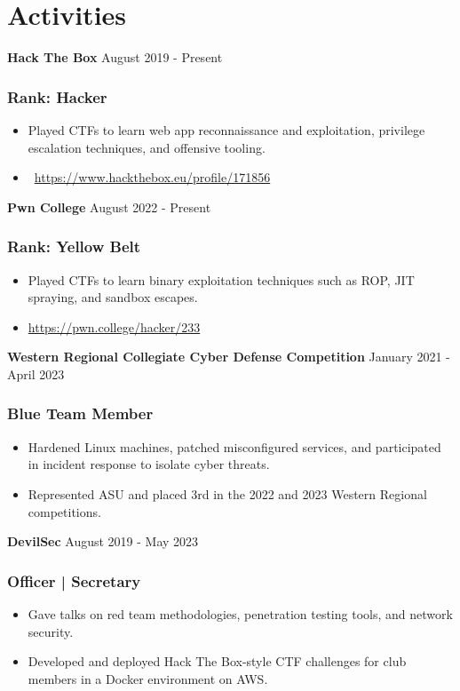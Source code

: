 \documentclass{article}
\newcommand{\resumesubsection}[2]{
	\noindent \textbf{#1} \hfill #2
}
\begin{document}
\section{Activities}

\resumesubsection{Hack The Box}{August 2019 - Present}
\subsubsection{Rank: Hacker}
\begin{itemize}
  \item Played CTFs to learn web app reconnaissance and exploitation, privilege escalation techniques, and offensive tooling.
  \item \faCube \ \url{https://www.hackthebox.eu/profile/171856}{}
\end{itemize}

\resumesubsection{Pwn College}{August 2022 - Present}
\subsubsection{Rank: Yellow Belt}
\begin{itemize}
  \item Played CTFs to learn binary exploitation techniques such as ROP, JIT spraying, and sandbox escapes.
  \item \url{https://pwn.college/hacker/233}
\end{itemize}

\resumesubsection{Western Regional Collegiate Cyber Defense Competition}{January 2021 - April 2023}
\subsubsection{Blue Team Member}
\begin{itemize}
	\item Hardened Linux machines, patched misconfigured services, and participated in incident response to isolate cyber threats.
  \item Represented ASU and placed 3rd in the 2022 and 2023 Western Regional competitions.
\end{itemize}

\resumesubsection{DevilSec}{August 2019 - May 2023}
\subsubsection{Officer | Secretary}
\begin{itemize} 
	\item Gave talks on red team methodologies, penetration testing tools, and network security.
  \item Developed and deployed Hack The Box-style CTF challenges for club members in a Docker environment on AWS.
\end{itemize}
\end{document}
